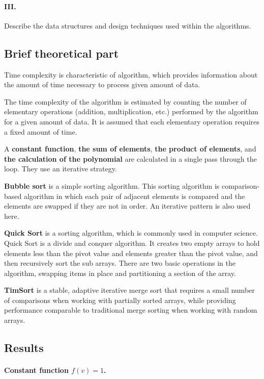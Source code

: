 \paragraph{III.}
Describe the data structures and design techniques used within the algorithms.

\subsection{Brief theoretical part}

Time complexity is characteristic of algorithm, which provides information about the amount of time necessary to process given amount of data.

The time complexity of the algorithm is estimated by counting the number of elementary operations (addition, multiplication, etc.) performed by the algorithm for a given amount of data. It is assumed that each elementary operation requires a fixed amount of time.

A \textbf{constant function}, \textbf{the sum of elements}, \textbf{the product of elements}, and \textbf{the calculation of the polynomial} are calculated in a single pass through the loop.
They use an iterative strategy.

\textbf{Bubble sort} is a simple sorting algorithm.
This sorting algorithm is comparison-based algorithm in which each pair of adjacent elements is compared and the elements are swapped if they are not in order.
An iterative pattern is also used here.

\textbf{Quick Sort} is a sorting algorithm, which is commonly used in computer science.
Quick Sort is a divide and conquer algorithm.
It creates two empty arrays to hold elements less than the pivot value and elements greater than the pivot value, and then recursively sort the sub arrays.
There are two basic operations in the algorithm, swapping items in place and partitioning a section of the array.

\textbf{TimSort} is a stable, adaptive iterative merge sort that requires a small number of comparisons when working with partially sorted arrays, while providing performance comparable to traditional merge sorting when working with random arrays.

\subsection{Results}

\paragraph{Constant function $f(v) = 1$.}

